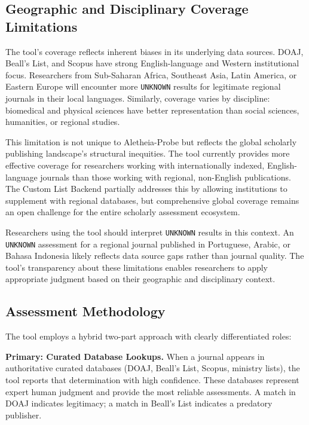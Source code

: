 \documentclass[fleqn,10pt]{SelfArx}
\begin{document}
\subsection{Geographic and Disciplinary Coverage Limitations}

The tool's coverage reflects inherent biases in its underlying data
sources. DOAJ, Beall's List, and Scopus have strong English-language
and Western institutional focus. Researchers from Sub-Saharan Africa,
Southeast Asia, Latin America, or Eastern Europe will encounter more
\texttt{UNKNOWN} results for legitimate regional journals in their
local languages. Similarly, coverage varies by discipline: biomedical
and physical sciences have better representation than social sciences,
humanities, or regional studies.

This limitation is not unique to Aletheia-Probe but reflects the
global scholarly publishing landscape's structural inequities. The tool
currently provides more effective coverage for researchers working with
internationally indexed, English-language journals than those working
with regional, non-English publications.
The Custom List Backend partially addresses this by allowing
institutions to supplement with regional databases, but comprehensive
global coverage remains an open challenge for the entire scholarly
assessment ecosystem.

Researchers using the tool should interpret \texttt{UNKNOWN} results in
this context. An \texttt{UNKNOWN} assessment for a regional journal
published in Portuguese, Arabic, or Bahasa Indonesia likely reflects
data source gaps rather than journal quality. The tool's transparency
about these limitations enables researchers to apply appropriate
judgment based on their geographic and disciplinary context.

\subsection{Assessment Methodology}

The tool employs a hybrid two-part approach with clearly differentiated
roles:

\textbf{Primary: Curated Database Lookups.} When a journal appears in
authoritative curated databases (DOAJ, Beall's List, Scopus, ministry
lists), the tool reports that determination with high confidence. These
databases represent expert human judgment and provide the most
reliable assessments. A match in DOAJ indicates legitimacy; a match in
Beall's List indicates a predatory publisher.
\end{document}
